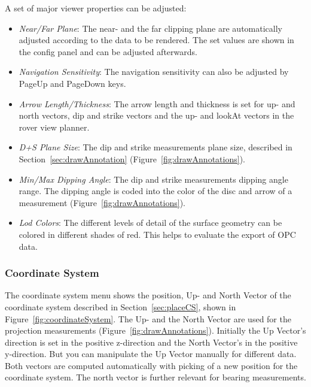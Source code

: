 A set of major viewer properties can be adjusted:
\begin{itemize}
	\item \textit{Near/Far Plane}: The near- and the far clipping plane are automatically adjusted according to the data to be rendered. The set values are shown in the config panel and can be adjusted afterwards. 
	\item \textit{Navigation Sensitivity}: The navigation sensitivity can also be adjusted by PageUp and PageDown keys. 
	\item \textit{Arrow Length/Thickness}: The arrow length and thickness is set for up- and north vectors, dip and strike vectors and the up- and lookAt vectors in the rover view planner. 
	\item \textit{D+S Plane Size}: The dip and strike measurements plane size, described in Section~\ref{sec:drawAnnotation}
 (Figure~\ref{fig:drawAnnotations}).
	\item \textit{Min/Max Dipping Angle}: The dip and strike measurements dipping angle range. The dipping angle is coded into the color of the disc and arrow of a measurement (Figure~\ref{fig:drawAnnotations}).
	\item \textit{Lod Colors}: The different levels of detail of the surface geometry can be colored in different shades of red.
			This helps to evaluate the export of OPC data.
\end{itemize}

\subsubsection{Coordinate System} 

The coordinate system menu shows the position, Up- and North Vector of the coordinate system described in Section~\ref{sec:placeCS}, shown in Figure~\ref{fig:coordinateSystem}.
The Up- and the North Vector are used for the projection measurements (Figure~\ref{fig:drawAnnotations}). Initially the Up Vector's direction is set in the positive z-direction and the North Vector's in the positive y-direction. But you can manipulate the Up Vector manually for different data. Both vectors are computed automatically with picking of a new position for the coordinate system. The north vector is further relevant for bearing measurements. %

